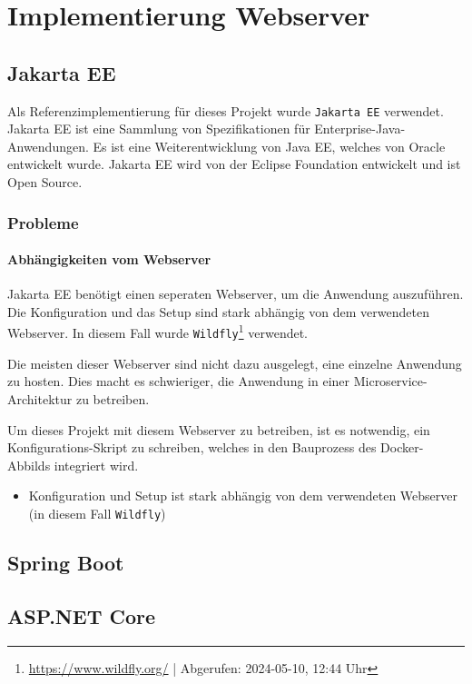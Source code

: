 \chapter{Implementierung Webserver}

\section{Jakarta EE}

Als Referenzimplementierung für dieses Projekt wurde \texttt{Jakarta EE} verwendet.
Jakarta EE ist eine Sammlung von Spezifikationen für Enterprise-Java-Anwendungen.
Es ist eine Weiterentwicklung von Java EE, welches von Oracle entwickelt wurde.
Jakarta EE wird von der Eclipse Foundation entwickelt und ist Open Source.


\subsection{Probleme}

\subsubsection*{Abhängigkeiten vom Webserver}

Jakarta EE benötigt einen seperaten Webserver, um die Anwendung auszuführen. 
Die Konfiguration und das Setup sind stark abhängig von dem verwendeten Webserver. 
In diesem Fall wurde \texttt{Wildfly}\footnote{\url{https://www.wildfly.org/} | Abgerufen: 2024-05-10, 12:44 Uhr} verwendet.

Die meisten dieser Webserver sind nicht dazu ausgelegt, eine einzelne Anwendung zu hosten.
Dies macht es schwieriger, die Anwendung in einer Microservice-Architektur zu betreiben.

Um dieses Projekt mit diesem Webserver zu betreiben, ist es notwendig, ein Konfigurations-Skript zu schreiben, welches in den Bauprozess des Docker-Abbilds integriert wird.

\begin{itemize}
    \item Konfiguration und Setup ist stark abhängig von dem verwendeten Webserver (in diesem Fall \texttt{Wildfly})
\end{itemize}

\section{Spring Boot}

\section{ASP.NET Core}

